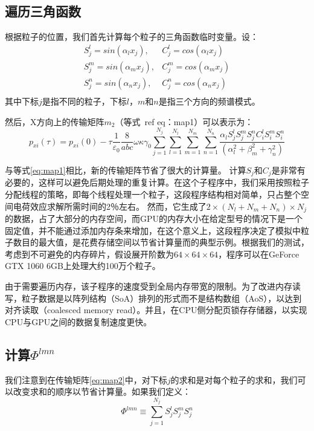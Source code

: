 \subsection{遍历三角函数}
根据粒子的位置，我们首先计算每个粒子的三角函数临时变量。设：
\begin{equation}
\begin{array}{cc}
    S^{l}_j =sin(\alpha_l x_j), & C^{l}_j =cos(\alpha_l x_j)  \\
    S^{m}_j =sin(\alpha_m x_j), & C^{m}_j =cos(\alpha_m x_j)  \\
    S^{n}_j =sin(\alpha_n x_j), & C^{n}_j =cos(\alpha_n x_j)  \\
\end{array}
\end{equation}
其中下标$j$是指不同的粒子，下标$l$，$m$和$n$是指三个方向的频谱模式。

然后，X方向上的传输矩阵$ m_2 $（等式\ ref {eq：map1}）可以表示为：
\begin{equation}\label{eq:map2}
{{p}_{xi}}(\tau )={{p}_{xi}}(0)-\tau \frac{1}{{{\varepsilon }_{0}}}\frac{8}{abc}\omega \kappa {{\gamma }_{0}}\sum\limits_{j=1}^{{{N}_{j}}}{\sum\limits_{l=1}^{{{N}_{l}}}{\sum\limits_{m=1}^{{{N}_{m}}}{\sum\limits_{n=1}^{{{N}_{n}}}{\frac{{{\alpha }_{l}}S_{j}^{l}S_{j}^{m}S_{j}^{n}C_{i}^{l}S_{i}^{m}S_{i}^{n}}{(\alpha _{l}^{2}+\beta _{m}^{2}+\gamma _{n}^{2})}}}}}
\end{equation}

与等式\ref{eq:map1}相比，新的传输矩阵节省了很大的计算量。
计算$ S_ {j} $和$ C_ {j}$是非常有必要的，这样可以避免后期处理的重复计算。在这个子程序中，我们采用按照粒子分配线程的策略，即每个线程处理一个粒子，这段程序结构相对简单，只占整个空间电荷效应求解所需时间的2％左右。 然而，它生成了$ 2 \times({{N}_{l}} + {{N}_{m}} + {{N}_{n}})\times {{N} _ {j}} $ 的数据，占了大部分的内存空间，而GPU的内存大小在给定型号的情况下是一个固定值，并不能通过添加内存条来增加，在这个意义上，这段程序决定了模拟中粒子数目的最大值，是花费存储空间以节省计算量而的典型示例。根据我们的测试，考虑到不可避免的内存碎片，假设展开阶数为$64\times64\times64$，程序可以在GeForce GTX 1060 6GB上处理大约100万个粒子。

由于需要遍历内存，该子程序的速度受到全局内存带宽的限制。为了改进内存读写，粒子数据是以阵列结构（SoA）排列的形式而不是结构数组（AoS），以达到对齐读取（coalesced memory read）。并且，在CPU侧分配页锁存存储器，以实现 CPU与GPU之间的数据复制速度更快。

\subsection{计算$\Phi^{lmn}$}\label{section:phi}
我们注意到在传输矩阵\ref{eq:map2}中，对下标$j$的求和是对每个粒子的求和，我们可以改变求和的顺序以节省计算量。如果我们定义：
\begin{equation}
\Phi^{lmn}\equiv \sum\limits_{j=1}^{{{N}_{j}}}{S_{j}^{l}S_{j}^{m}S_{j}^{n}}
\end{equation}

